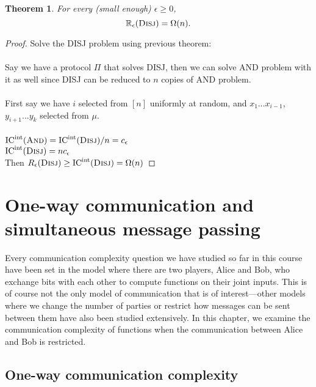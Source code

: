 \documentclass[11pt,oneside]{book}
\theoremstyle{plain}
\newtheorem{theorem}{Theorem}
\theoremstyle{definition}
\theoremstyle{plain}
\newcommand{\Disj}{\textsc{Disj}}
\newcommand{\ICint}{\mathrm{IC}^{\mathrm{int}}}
\newcommand{\R}{\mathbb{R}}
\begin{document}
\begin{theorem}
	For every (small enough) $\epsilon \ge 0$, 
	\[
	\R_\epsilon(\Disj) = \Omega(n).
	\]
\end{theorem}

\begin{proof}
Solve the DISJ problem using previous theorem:\\
 \\
Say we have a protocol $\Pi$ that solves DISJ, then we can solve AND problem with it as well since DISJ can be reduced to $n$ copies of AND problem.\\
 \\
First say we have $i$ selected from $[n]$ uniformly at random, and $x_1\dots x_{i-1}$, $y_{i+1}\dots y_k$ selected from $\mu$.\\
 \\
$\ICint(\textsc{And}) = \ICint(\Disj)/n = c_\epsilon$\\
$\ICint(\Disj) = nc_\epsilon$\\ 
Then $R_\epsilon(\Disj) \ge \ICint(\Disj) = \Omega(n)$
\end{proof}

	


\chapter[CH06]{ One-way communication and simultaneous message passing}


Every communication complexity question we have studied so far in this course have been set in the model where there are two players, Alice and Bob, who exchange bits with each other to compute functions on their joint inputs. This is of course not the only model of communication that is of interest---other models where we change the number of parties or restrict how messages can be sent between them have also been studied extensively. In this chapter, we examine the communication complexity of functions when the communication between Alice and Bob is restricted.

\newpage

 
\section{One-way communication complexity}
\end{document}
